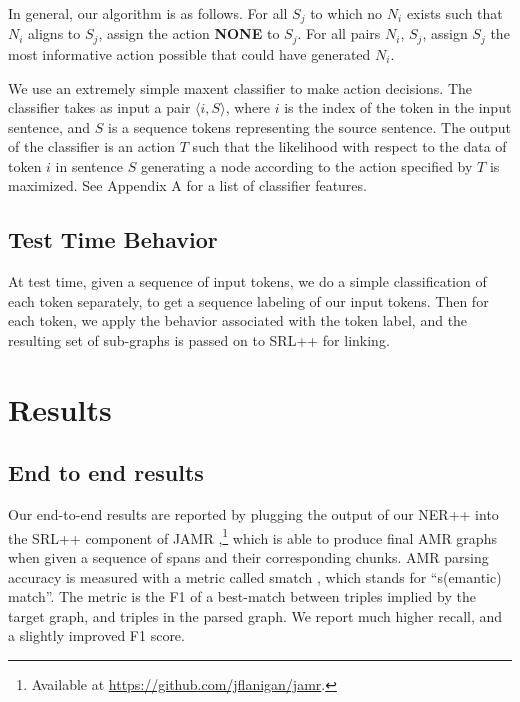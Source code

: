 \documentclass[11pt]{article}
\begin{document}
In general, our algorithm is as follows. For all $S_j$ to which no $N_i$ exists such that $N_i$ aligns to $S_j$, assign the action \textbf{NONE} to $S_j$. For all pairs $N_i$, $S_j$, assign $S_j$ the most informative action possible that could have generated $N_i$. 


We use an extremely simple maxent classifier to make action decisions. The classifier takes as input a pair $\langle i, S \rangle$, where $i$ is the index of the token in the input sentence, and $S$ is a sequence tokens representing the source sentence. The output of the classifier is an action $T$ such that the likelihood with respect to the data of token $i$ in sentence $S$ generating a node according to the action specified by $T$ is maximized. See Appendix A for a list of classifier features.


\subsection{Test Time Behavior}

At test time, given a sequence of input tokens, we do a simple classification of each token separately, to get a sequence labeling of our input tokens. Then for each token, we apply the behavior associated with the token label, and the resulting set of sub-graphs is passed on to SRL++ for linking.

% 

\section{Results}

\subsection{End to end results}

Our end-to-end results are reported by plugging the output of our NER++ into the SRL++ component of JAMR \cite{2014flanigan-amr},\footnote
  {Available at \url{https://github.com/jflanigan/jamr}.}
which is able to produce final AMR graphs when given a sequence of spans and their corresponding chunks. AMR parsing accuracy is measured with a metric called smatch \needcite, which stands for ``s(emantic) match''. The metric is the F1 of a best-match between triples implied by the target graph, and triples in the parsed graph. We report much higher recall, and a slightly improved F1 score.
\end{document}
